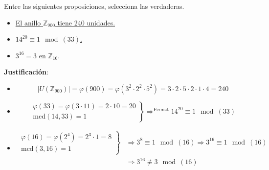 \begin{ejercicio}
    Entre las siguientes proposiciones, selecciona las verdaderas.
    \begin{itemize}
        \item \underline{El anillo $\mathbb{Z}_{900}$ tiene 240 unidades.}
        \item \underline{$14^{20}\equiv 1\mod (33)$.}
        \item $3^{16}=3$ en $\mathbb{Z}_{16}$.
    \end{itemize}

    \noindent
    \textbf{Justificación}:
    \begin{itemize}
        \item 
            \begin{equation*}
                |U(\mathbb{Z}_{900})| = \varphi(900) = \varphi(3^2 \cdot 2^2 \cdot 5^2) = 3\cdot 2\cdot 5\cdot 2\cdot 1\cdot 4 = 240
            \end{equation*}
        \item 
            \begin{equation*}
                \left.\begin{array}{r}
                    \varphi(33) = \varphi(3\cdot 11) = 2\cdot 10 = 20 \\
                    \text{mcd}(14,33) = 1
            \end{array}\right\} \mathop{\Longrightarrow}^{\text{Fermat}} 14^{20}\equiv 1\mod(33)
            \end{equation*}
        \item 
            \begin{align*}
                \left.\begin{array}{r}
                    \varphi(16) = \varphi(2^4) = 2^3 \cdot 1 =8 \\
                    \text{mcd}(3,16) = 1
            \end{array}\right\} &\Longrightarrow 3^8\equiv 1\mod (16) \Longrightarrow 3^{16}\equiv 1\mod(16) \\
            &\Longrightarrow 3^{16}\not\equiv 3\mod(16)
            \end{align*}
    \end{itemize}
\end{ejercicio}

